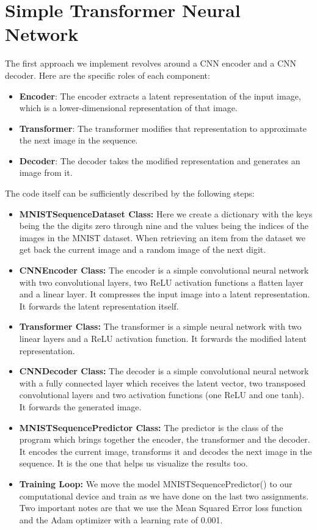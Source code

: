\documentclass[lettersize,journal]{IEEEtran}
\begin{document}
\section{Simple Transformer Neural Network}
The first approach we implement revolves around a CNN encoder and a CNN decoder. 
Here are the specific roles of each component:
\begin{itemize}
    \item \textbf{Encoder}: The encoder extracts a latent representation of the input image, which is 
    a lower-dimensional representation of that image.
    \item \textbf{Transformer}: The transformer modifies that representation to approximate 
    the next image in the sequence.
    \item \textbf{Decoder}: The decoder takes the modified representation and generates an
    image from it.
\end{itemize}
The code itself can be sufficiently described by the following steps:
\begin{itemize}
    \item \textbf{MNISTSequenceDataset Class:} Here we create a dictionary with the keys being the 
    the digits zero through nine and the values being the indices of the images in the MNIST dataset.
    When retrieving an item from the dataset we get back the current image and a random image of the 
    next digit.
    \item \textbf{CNNEncoder Class:} The encoder is a simple convolutional neural network with two
    convolutional layers, two ReLU activation functions a flatten layer and a linear layer. It compresses
    the input image into a latent representation. It forwards the latent representation itself.
    \item \textbf{Transformer Class:} The transformer is a simple neural network with two linear layers
    and a ReLU activation function. It forwards the modified latent representation.
    \item \textbf{CNNDecoder Class:} The decoder is a simple convolutional neural network with 
    a fully connected layer which receives the latent vector, two transposed convolutional layers and 
    two activation functions (one ReLU and one tanh). It forwards the generated image.
    \item \textbf{MNISTSequencePredictor Class:} The predictor is the class of the program which brings
    together the encoder, the transformer and the decoder. It encodes the current image, transforms it
    and decodes the next image in the sequence. It is the one that helps us visualize the results too.
    \item \textbf{Training Loop:} We move the model MNISTSequencePredictor() to our computational device
    and train as we have done on the last two assignments. Two important notes are that we use the Mean 
    Squared Error loss function and the Adam optimizer with a learning rate of 0.001.
\end{itemize}
\end{document}
